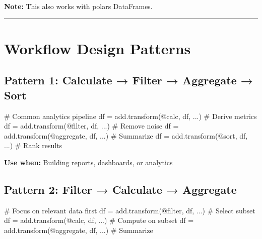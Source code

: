 \documentclass[
  letterpaper,
]{scrbook}
\newenvironment{Shaded}{\begin{snugshade}}{\end{snugshade}}
\newcommand{\CommentTok}[1]{\textcolor[rgb]{0.37,0.37,0.37}{#1}}
\newcommand{\NormalTok}[1]{\textcolor[rgb]{0.00,0.23,0.31}{#1}}
\newcommand{\OperatorTok}[1]{\textcolor[rgb]{0.37,0.37,0.37}{#1}}
\newcommand{\StringTok}[1]{\textcolor[rgb]{0.13,0.47,0.30}{#1}}
\begin{document}
\textbf{Note:} This also works with polars DataFrames.

\begin{center}\rule{0.5\linewidth}{0.5pt}\end{center}

\section{Workflow Design Patterns}\label{workflow-design-patterns}

\subsection{Pattern 1: Calculate → Filter → Aggregate →
Sort}\label{pattern-1-calculate-filter-aggregate-sort}

\begin{Shaded}
\begin{Highlighting}[]
\CommentTok{\# Common analytics pipeline}
\NormalTok{df }\OperatorTok{=}\NormalTok{ add.transform(}\StringTok{\textquotesingle{}@calc\textquotesingle{}}\NormalTok{, df, ...)      }\CommentTok{\# Derive metrics}
\NormalTok{df }\OperatorTok{=}\NormalTok{ add.transform(}\StringTok{\textquotesingle{}@filter\textquotesingle{}}\NormalTok{, df, ...)    }\CommentTok{\# Remove noise}
\NormalTok{df }\OperatorTok{=}\NormalTok{ add.transform(}\StringTok{\textquotesingle{}@aggregate\textquotesingle{}}\NormalTok{, df, ...) }\CommentTok{\# Summarize}
\NormalTok{df }\OperatorTok{=}\NormalTok{ add.transform(}\StringTok{\textquotesingle{}@sort\textquotesingle{}}\NormalTok{, df, ...)      }\CommentTok{\# Rank results}
\end{Highlighting}
\end{Shaded}

\textbf{Use when:} Building reports, dashboards, or analytics

\subsection{Pattern 2: Filter → Calculate →
Aggregate}\label{pattern-2-filter-calculate-aggregate}

\begin{Shaded}
\begin{Highlighting}[]
\CommentTok{\# Focus on relevant data first}
\NormalTok{df }\OperatorTok{=}\NormalTok{ add.transform(}\StringTok{\textquotesingle{}@filter\textquotesingle{}}\NormalTok{, df, ...)    }\CommentTok{\# Select subset}
\NormalTok{df }\OperatorTok{=}\NormalTok{ add.transform(}\StringTok{\textquotesingle{}@calc\textquotesingle{}}\NormalTok{, df, ...)      }\CommentTok{\# Compute on subset}
\NormalTok{df }\OperatorTok{=}\NormalTok{ add.transform(}\StringTok{\textquotesingle{}@aggregate\textquotesingle{}}\NormalTok{, df, ...) }\CommentTok{\# Summarize}
\end{Highlighting}
\end{Shaded}
\end{document}
